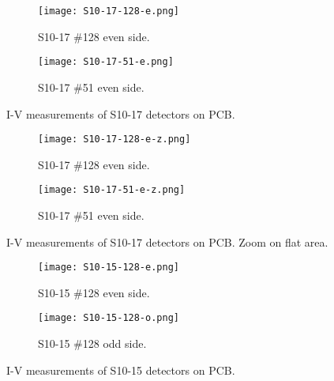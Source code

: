 \documentclass[../main/thesis.tex]{subfiles}
\begin{document}
\begin{figure}[p]
	\centering
	\begin{subfigure}{.5\textwidth}
		\centering
		\texttt{[image: S10-17-128-e.png]}
		\caption{S10-17 \#128 even side.}
		\label{fig-S10-17-128-e}
	\end{subfigure}%
	\begin{subfigure}{.5\textwidth}
		\centering
		\texttt{[image: S10-17-51-e.png]}
		\caption{S10-17 \#51 even side.}
		\label{fig-S10-17-51-e} 
	\end{subfigure}
	\caption{I-V measurements of S10-17 detectors on PCB.}
	\label{fig-3d-iv-S10-17}
\end{figure}

\begin{figure}[p]
	\centering
	\begin{subfigure}{.5\textwidth}
		\centering
		\texttt{[image: S10-17-128-e-z.png]}
		\caption{S10-17 \#128 even side.}
		\label{fig-S10-17-128-e-z}
	\end{subfigure}%
	\begin{subfigure}{.5\textwidth}
		\centering
		\texttt{[image: S10-17-51-e-z.png]}
		\caption{S10-17 \#51 even side.}
		\label{fig-S10-17-51-e-z} 
	\end{subfigure}
	\caption{I-V measurements of S10-17 detectors on PCB. Zoom on flat area.}
	\label{fig-3d-iv-S10-17-z}
\end{figure}

\begin{figure}[p]
	\centering
	\begin{subfigure}{.5\textwidth}
		\centering
		\texttt{[image: S10-15-128-e.png]}
		\caption{S10-15 \#128 even side.}
		\label{fig-S10-15-128-e}
	\end{subfigure}%
	\begin{subfigure}{.5\textwidth}
		\centering
		\texttt{[image: S10-15-128-o.png]}
		\caption{S10-15 \#128 odd side.}
		\label{fig-S10-15-128-o}
	\end{subfigure}
	\caption{I-V measurements of S10-15 detectors on PCB.}
	\label{fig-3d-iv-S10-15}
\end{figure}
\end{document}
